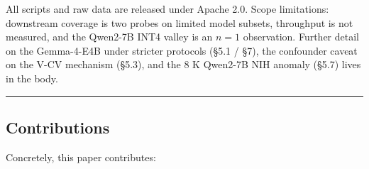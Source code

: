 \documentclass[
]{article}
\begin{document}
All scripts and raw data are released under Apache 2.0. Scope
limitations: downstream coverage is two probes on limited model subsets,
throughput is not measured, and the Qwen2-7B INT4 valley is an \(n = 1\)
observation. Further detail on the Gemma-4-E4B under stricter protocols
(§5.1 / §7), the confounder caveat on the V-CV mechanism (§5.3), and the
8 K Qwen2-7B NIH anomaly (§5.7) lives in the body.

\begin{center}\rule{0.5\linewidth}{0.5pt}\end{center}

\subsection{Contributions}\label{contributions}

Concretely, this paper contributes:
\end{document}

